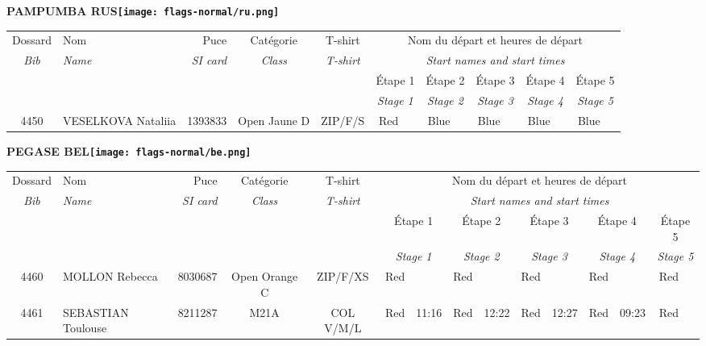 \documentclass{report}
\begin{document}
\newpage
  \Huge \centering \bfseries PAMPUMBA  RUS\normalfont \footnotesize \sffamily \hfill \texttt{[image: flags-normal/ru.png]} \newline 
  \begin{longtable}{|c|l|r|c|c|*{5}{cc|}}
    Dossard & Nom  & Puce    & Catégorie & T-shirt & \multicolumn{10}{c|}{Nom du départ et heures de départ} \\
    \itshape Bib     & \itshape Name & \itshape SI card & \itshape Class  & \itshape  T-shirt  & \multicolumn{10}{c|}{\itshape Start names and start times} \\
    \hline
    & & & & & \multicolumn{2}{c|}{Étape 1} & \multicolumn{2}{c|}{Étape 2} & \multicolumn{2}{c|}{Étape 3} & \multicolumn{2}{c|}{Étape 4} & \multicolumn{2}{c|}{Étape 5} \\
    & & & & & \multicolumn{2}{c|}{\itshape Stage 1} & \multicolumn{2}{c|}{\itshape Stage 2} & \multicolumn{2}{c|}{\itshape Stage 3} & \multicolumn{2}{c|}{\itshape Stage 4} & \multicolumn{2}{c|}{\itshape Stage 5} \\
    \hline
    4450 & VESELKOVA Nataliia & 1393833 & Open Jaune D & ZIP/F/S & Red &   & Blue &   & Blue &   & Blue &   & Blue &  \\
  \end{longtable}
\newpage
  \Huge \centering \bfseries PEGASE  BEL\normalfont \footnotesize \sffamily \hfill \texttt{[image: flags-normal/be.png]} \newline 
  \begin{longtable}{|c|l|r|c|c|*{5}{cc|}}
    Dossard & Nom  & Puce    & Catégorie & T-shirt & \multicolumn{10}{c|}{Nom du départ et heures de départ} \\
    \itshape Bib     & \itshape Name & \itshape SI card & \itshape Class  & \itshape  T-shirt  & \multicolumn{10}{c|}{\itshape Start names and start times} \\
    \hline
    & & & & & \multicolumn{2}{c|}{Étape 1} & \multicolumn{2}{c|}{Étape 2} & \multicolumn{2}{c|}{Étape 3} & \multicolumn{2}{c|}{Étape 4} & \multicolumn{2}{c|}{Étape 5} \\
    & & & & & \multicolumn{2}{c|}{\itshape Stage 1} & \multicolumn{2}{c|}{\itshape Stage 2} & \multicolumn{2}{c|}{\itshape Stage 3} & \multicolumn{2}{c|}{\itshape Stage 4} & \multicolumn{2}{c|}{\itshape Stage 5} \\
    \hline
    4460 & MOLLON Rebecca & 8030687 & Open Orange C & ZIP/F/XS & Red &   & Red &   & Red &   & Red &   & Red &  \\
    4461 & SEBASTIAN Toulouse & 8211287 & M21A & COL V/M/L & Red & 11:16 & Red & 12:22 & Red & 12:27 & Red & 09:23 & Red &  \\
  \end{longtable}
\end{document}
